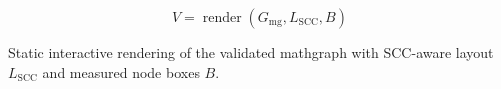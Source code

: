 \begin{equation}
V=\operatorname{render}(G_{\mathrm{mg}},L_{\mathrm{SCC}},B)
\label{figure:graph-view}
\end{equation}

Static interactive rendering of the validated mathgraph with SCC-aware layout \(L_{\mathrm{SCC}}\) and measured node boxes \(B\).
